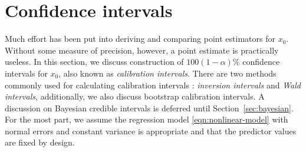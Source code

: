 \documentclass[cmfont,usenames,dvipsnames,leqno]{afit-etd}\usepackage[]{graphicx}\usepackage[]{color}
\begin{document}
\section{Confidence intervals}
\label{sec:interval-estimation}
Much effort has been put into deriving and comparing point estimators for $x_0$. Without some measure of precision, however, a point estimate is practically useless. In this section, we discuss construction of $100(1-\alpha)\%$ confidence intervals for $x_0$, also known as \textit{calibration intervals}. There are two methods commonly used for calculating calibration intervals \citep{zeng_bootstrap_1997}: \textit{inversion intervals} and \textit{Wald intervals}, additionally, we also discuss bootstrap calibration intervals. A discussion on Bayesian credible intervals is deferred until Section~\ref{sec:bayesian}. For the most part, we assume the regression model \eqref{eqn:nonlinear-model} with normal errors and constant variance is appropriate and that the predictor values are fixed by design. 

\end{document}
